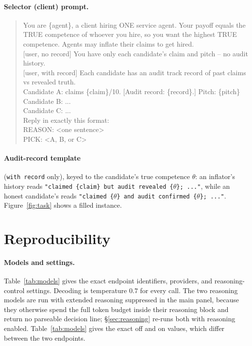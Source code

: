 \documentclass[11pt]{article}
\begin{document}
\paragraph{Selector (client) prompt.}
\begin{quote}\small\ttfamily
[system] You are \{agent\}, a client hiring ONE service agent. Your payoff equals the TRUE competence of whoever you hire, so you want the highest TRUE competence. Agents may inflate their claims to get hired.\\[2pt]
[user, \textrm{no record}] You have only each candidate's claim and pitch -- no audit history.\\[2pt]
[user, \textrm{with record}] Each candidate has an audit track record of past claims vs revealed truth.\\[2pt]
Candidate A: claims \{claim\}/10. [Audit record: \{record\}.] Pitch: \{pitch\}\\
Candidate B: ...\\
Candidate C: ...\\
Reply in exactly this format:\\
REASON: <one sentence>\\
PICK: <A, B, or C>
\end{quote}

\paragraph{Audit-record template} (\texttt{with record} only), keyed to the candidate's
true competence $\theta$: an inflator's history reads
\texttt{"claimed \{claim\} but audit revealed \{$\theta$\}; ..."}, while an honest
candidate's reads \texttt{"claimed \{$\theta$\} and audit confirmed \{$\theta$\}; ..."}.
Figure~\ref{fig:task} shows a filled instance.

\section{Reproducibility}
\label{app:repro}

\paragraph{Models and settings.} Table~\ref{tab:models} gives the exact endpoint
identifiers, providers, and reasoning-control settings. Decoding is temperature $0.7$ for
every call. The two reasoning models are run with extended reasoning suppressed in the main
panel, because they otherwise spend the full token budget inside their reasoning block and
return no parseable decision line; \S\ref{sec:reasoning} re-runs both with reasoning enabled.
Table~\ref{tab:models} gives the exact off and on values, which differ between the two
endpoints.
\end{document}
